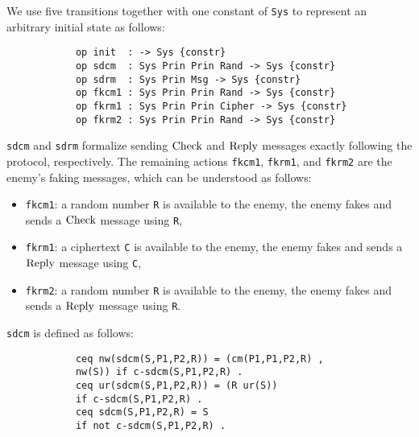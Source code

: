 \documentclass[10pt, conference, compsocconf]{IEEEtran}
\begin{document}
	We use five transitions together with one constant of \verb!Sys! to represent an arbitrary initial state as follows:
	
	\begin{small}
		\begin{verbatim}
			op init  : -> Sys {constr}
			op sdcm  : Sys Prin Prin Rand -> Sys {constr}
			op sdrm  : Sys Prin Msg -> Sys {constr}
			op fkcm1 : Sys Prin Prin Rand -> Sys {constr}
			op fkrm1 : Sys Prin Prin Cipher -> Sys {constr}
			op fkrm2 : Sys Prin Prin Rand -> Sys {constr}
		\end{verbatim}
	\end{small}
	
	\noindent
	\verb!sdcm! and \verb!sdrm! formalize sending $\rm Check$ and $\rm Reply$ messages exactly following the protocol, respectively.
	The remaining actions \verb!fkcm1!, \verb!fkrm1!, and \verb!fkrm2! are the enemy's faking messages, which can be understood as follows:
	\begin{itemize}
		\item \verb!fkcm1!: a random number \verb!R! is available to the enemy, the enemy fakes and sends a $\rm Check$ message using \verb!R!, 
		\item \verb!fkrm1!: a ciphertext \verb!C! is available to the enemy, the enemy fakes and sends a $\rm Reply$ message using \verb!C!, 
		\item \verb!fkrm2!: a random number \verb!R! is available to the enemy, the enemy fakes and sends a $\rm Reply$ message using \verb!R!.
	\end{itemize}
	
	\verb!sdcm! is defined as follows:
	\begin{small}
		\begin{verbatim}
			ceq nw(sdcm(S,P1,P2,R)) = (cm(P1,P1,P2,R) ,
			nw(S)) if c-sdcm(S,P1,P2,R) .
			ceq ur(sdcm(S,P1,P2,R)) = (R ur(S))
			if c-sdcm(S,P1,P2,R) .
			ceq sdcm(S,P1,P2,R) = S 
			if not c-sdcm(S,P1,P2,R) .
		\end{verbatim}
	\end{small}
	
\end{document}
